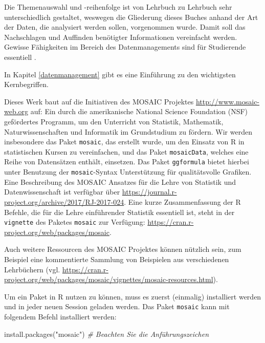 \documentclass[
  ngerman,
]{scrbook}
\newenvironment{Shaded}{\begin{snugshade}}{\end{snugshade}}
\newcommand{\CommentTok}[1]{\textcolor[rgb]{0.56,0.35,0.01}{\textit{#1}}}
\newcommand{\FunctionTok}[1]{\textcolor[rgb]{0.00,0.00,0.00}{#1}}
\newcommand{\NormalTok}[1]{#1}
\newcommand{\StringTok}[1]{\textcolor[rgb]{0.31,0.60,0.02}{#1}}
\begin{document}
Die Themenauswahl und -reihenfolge ist von Lehrbuch zu Lehrbuch sehr unterschiedlich gestaltet, weswegen die Gliederung dieses Buches anhand der Art der Daten, die analysiert werden sollen, vorgenommen wurde. Damit soll das Nachschlagen und Auffinden benötigter Informationen vereinfacht werden. Gewisse Fähigkeiten im Bereich des Datenmanagements sind für Studierende essentiell \autocite{ChanceInClass}.

In Kapitel \ref{datenmanagement} gibt es eine Einführung zu den wichtigsten Kernbegriffen.

Dieses Werk baut auf die Initiativen des MOSAIC Projektes \url{http://www.mosaic-web.org} auf: Ein durch die amerikanische National Science Foundation (NSF) gefördertes Programm, um den Unterricht von Statistik, Mathematik, Naturwissenschaften und Informatik im Grundstudium zu fördern. Wir werden insbesondere das Paket \texttt{mosaic}, das erstellt wurde, um den Einsatz von \textsf{R} in statistischen Kursen zu vereinfachen, und das Paket \texttt{mosaicData}, welches eine Reihe von Datensätzen enthält, einsetzen. Das Paket \texttt{ggformula} bietet hierbei unter Benutzung der \texttt{mosaic}-Syntax Unterstützung für qualitätsvolle Grafiken. Eine Beschreibung des MOSAIC Ansatzes für die Lehre von Statistik und Datenwissenschaft ist verfügbar über \url{https://journal.r-project.org/archive/2017/RJ-2017-024}. Eine kurze Zusammenfassung der \textsf{R} Befehle, die für die Lehre einführender Statistik essentiell ist, steht in der \texttt{vignette} des Paketes \texttt{mosaic} zur Verfügung:
\url{https://cran.r-project.org/web/packages/mosaic}.

Auch weitere Ressourcen des MOSAIC Projektes können nützlich sein, zum Beispiel eine kommentierte Sammlung von Beispielen aus verschiedenen Lehrbüchern (vgl. \url{https://cran.r-project.org/web/packages/mosaic/vignettes/mosaic-resources.html}).

Um ein Paket in \textsf{R} nutzen zu können, muss es zuerst (einmalig) installiert werden und in jeder neuen Session geladen werden. Das Paket \texttt{mosaic} kann mit folgendem Befehl installiert werden:

\begin{Shaded}
\begin{Highlighting}[]
\FunctionTok{install.packages}\NormalTok{(}\StringTok{"mosaic"}\NormalTok{)        }\CommentTok{\# Beachten Sie die Anführungszeichen}
\end{Highlighting}
\end{Shaded}
\end{document}
